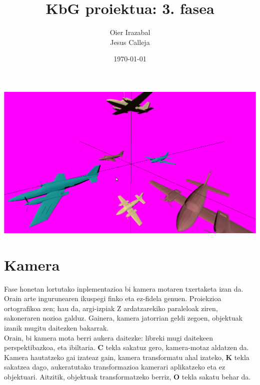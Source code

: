 \documentclass[12pt]{article}
\title{KbG proiektua: 3. fasea}
\author{
        Oier Irazabal\\
        Jesus Calleja
}
\date{\today}
\newcommand{\tekla}[1] {\textbf{#1}}
\begin{document}
\maketitle


\tableofcontents

\vspace{1.7cm}
\begin{center}
\includegraphics[scale=0.28]{fase_34_portada.png}\\
\end{center}

\pagebreak

\section{Kamera}

Fase honetan lortutako inplementazioa bi kamera motaren txertaketa izan da. Orain arte ingurunearen ikuspegi finko eta ez-fidela genuen. Proiekzioa ortografikoa zen; hau da, argi-izpiak Z ardatzarekiko paraleloak ziren, sakoneraren nozioa galduz. Gainera, kamera jatorrian geldi zegoen, objektuak izanik mugitu daitezken bakarrak.\\

Orain, bi kamera mota berri aukera daitezke: libreki mugi daitekeen perspektibazkoa, eta ibiltaria. \tekla{C} tekla sakatuz gero, kamera-motaz aldatzen da. Kamera hautatzeko gai izateaz gain, kamera transformatu ahal izateko, \tekla{K} tekla sakatzea dago, aukeratutako transformazioa kamerari aplikatzeko eta ez objektuari. Aitzitik, objektuak transformatzeko berriz, \tekla{O} tekla sakatu behar da.\\
\end{document}
